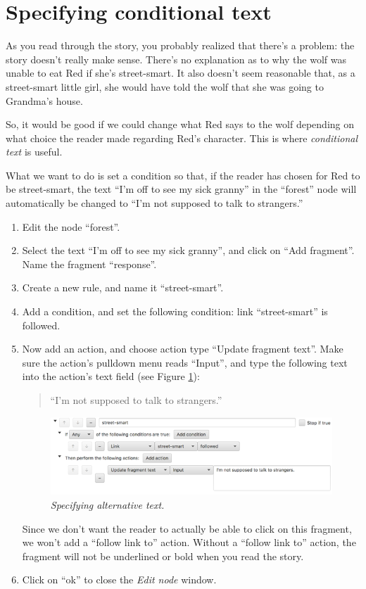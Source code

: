\documentclass{article}
\begin{document}
\section{Specifying conditional text}

As you read through the story, you probably realized that there's a problem: the story doesn't really make sense. There's no explanation as to why the wolf was unable to eat Red if she's street-smart. It also doesn't seem reasonable that, as a street-smart little girl, she would have told the wolf that she was going to Grandma's house.

So, it would be good if we could change what Red says to the wolf depending on what choice the reader made regarding Red's character. This is where \textit{conditional text} is useful.

What we want to do is set a condition so that, if the reader has chosen for Red to be street-smart, the text ``I'm off to see my sick granny'' in the ``forest'' node will automatically be changed to ``I'm not supposed to talk to strangers.''

\begin{enumerate}
  \item Edit the node ``forest''.
  \item Select the text ``I'm off to see my sick granny'', and click on
  ``Add fragment''. Name the fragment ``response''.
  \item Create a new rule, and name it ``street-smart''.
  \item Add a condition, and set the following condition: link ``street-smart'' is followed.
  \item Now add an action, and choose action type ``Update fragment text''. Make sure the action's pulldown menu reads ``Input'', and type the following text into the action's text field (see Figure \ref{fig:tut2:alttext}):
  \begin{quotation}
  \noindent ``I'm not supposed to talk to strangers.''
  \end{quotation}

\begin{figure}[h]
  \centering
  \includegraphics[width=12cm]{images/hypedyn-tutorial-2-figure-8}
  \caption{\textit{Specifying alternative text.}}
  \label{fig:tut2:alttext}
\end{figure} 

Since we don't want the reader to actually be able to click on this fragment, we won't add a ``follow link to'' action. Without a ``follow link to'' action, the fragment will not be underlined or bold when you read the story.
  \item Click on ``ok'' to close the \textit{Edit node} window.
\end{enumerate}
\end{document}
